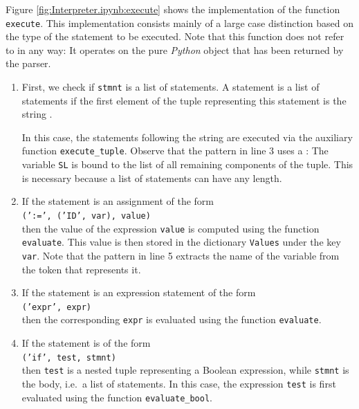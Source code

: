 Figure \ref{fig:Interpreter.ipynb:execute} shows the implementation of the function \texttt{execute}.  This
implementation consists mainly of a large case distinction based on the type of the statement to be
executed.  Note that this function does not refer to  in any way:  It operates on the pure
\textsl{Python} object that has been returned by the parser.
\begin{enumerate}
\item First, we check if \texttt{stmnt} is a list of statements.  A statement is a list of statements
      if the first element of the tuple representing this statement is the string .

      In this case, the statements following the string  are executed via the auxiliary
      function \texttt{execute\_tuple}.  Observe that the pattern in line 3 uses a
      :  The variable \texttt{SL} is bound to the list of
      all remaining components of the tuple.  This is necessary because a list of statements can have any
      length.
\item If the statement is an assignment of the form
      \\[0.2cm]
      \hspace*{1.3cm}
      \texttt{(':=', ('ID', var), value)}
      \\[0.2cm]
      then the value of the expression \texttt{value} is computed using the function \texttt{evaluate}.
      This value is then stored in the dictionary \texttt{Values} under the key \texttt{var}.  Note that the
      pattern in line 5 extracts the name of the variable from the token that represents it.
\item If the statement is an expression statement of the form
      \\[0.2cm]
      \hspace*{1.3cm}
      \texttt{('expr', expr)}
      \\[0.2cm]
      then the corresponding \texttt{expr} is evaluated using the function \texttt{evaluate}.
\item If the statement is of the form
      \\[0.2cm]
      \hspace*{1.3cm}
      \texttt{('if', test, stmnt)}
      \\[0.2cm]
      then \texttt{test} is a nested tuple representing a Boolean expression, while \texttt{stmnt} is the body,
      i.e.~a list of statements.
      In this case, the expression \texttt{test} is first evaluated using the function \texttt{evaluate\_bool}.

\end{enumerate}
